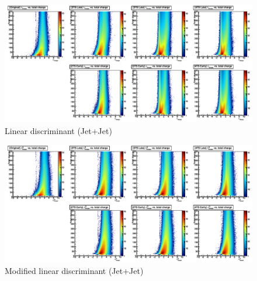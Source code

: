 \begin{figure}
   \includegraphics[width=120mm]{DailyLog/6411/6411_MixJetOnJetLambdaLinear.pdf}
   \caption{Linear discriminant (Jet+Jet)}
   \label{Figure_6411_MixJetOnJetLambdaLinear}
\end{figure}
\begin{figure}
   \includegraphics[width=120mm]{DailyLog/6411/6411_MixJetOnJetLambdaDLinear.pdf}
   \caption{Modified linear discriminant (Jet+Jet)}
   \label{Figure_6411_MixJetOnJetLambdaDLinear}
\end{figure}

